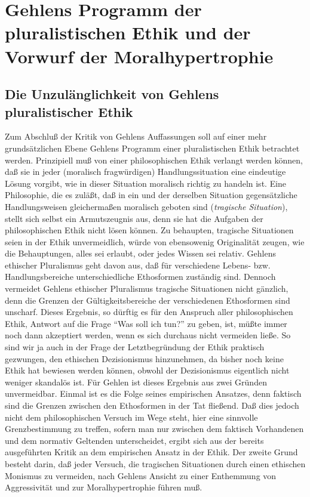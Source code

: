\documentclass[12pt,a4paper]{article}
\begin{document}
\section{Gehlens Programm der pluralistischen Ethik und der Vorwurf der Moralhypertrophie}

\subsection{Die Unzulänglichkeit von Gehlens pluralistischer Ethik}

Zum Abschluß der Kritik von Gehlens Auffassungen soll auf einer mehr
grundsätzlichen Ebene Gehlens Programm einer pluralistischen Ethik
betrachtet werden. Prinzipiell muß von einer philosophischen Ethik verlangt
werden können, daß sie in jeder (moralisch fragwürdigen)
Handlungssituation eine eindeutige Lösung vorgibt, wie in dieser Situation
moralisch richtig zu handeln ist. Eine Philosophie, die es zuläßt, daß in
ein und der derselben Situation gegensätzliche Handlungsweisen
gleichermaßen moralisch geboten sind ({\em tragische Situation}), stellt
sich selbst ein Armutszeugnis aus, denn sie hat die Aufgaben der
philosophischen Ethik nicht lösen können. Zu behaupten, tragische
Situationen seien in der Ethik unvermeidlich, würde von ebensowenig
Originalität zeugen, wie die Behauptungen, alles sei erlaubt, oder jedes
Wissen sei relativ. Gehlens ethischer Pluralismus geht davon aus, daß für
verschiedene Lebens- bzw. Handlungsbereiche unterschiedliche Ethosformen
zuständig sind. Dennoch vermeidet Gehlens ethischer Pluralismus tragische
Situationen nicht gänzlich, denn die Grenzen der Gültigkeitsbereiche der
verschiedenen Ethosformen sind unscharf. Dieses Ergebnis, so dürftig es für
den Anspruch aller philosophischen Ethik, Antwort auf die Frage "`Was soll
ich tun?"' zu geben, ist, müßte immer noch dann akzeptiert werden, wenn es
sich durchaus nicht vermeiden ließe. So sind wir ja auch in der Frage der
Letztbegründung der Ethik praktisch gezwungen, den ethischen Dezisionismus
hinzunehmen, da bisher noch keine Ethik hat bewiesen werden können, obwohl
der Dezisionismus eigentlich nicht weniger skandalös ist. Für Gehlen ist
dieses Ergebnis aus zwei Gründen unvermeidbar. Einmal ist es die
Folge seines empirischen Ansatzes, denn faktisch sind die Grenzen zwischen
den Ethosformen in der Tat fließend. Daß dies jedoch nicht dem
philosophischen Versuch im Wege steht, hier eine sinnvolle Grenzbestimmung zu
treffen, sofern man nur zwischen dem faktisch Vorhandenen und dem normativ
Geltenden unterscheidet, ergibt sich aus der bereits ausgeführten Kritik an
dem empirischen Ansatz in der Ethik. Der zweite Grund besteht darin, daß
jeder Versuch, die tragischen Situationen durch einen ethischen Monismus zu
vermeiden, nach Gehlens Ansicht zu einer Enthemmung von Aggressivität und zur
Moralhypertrophie führen muß.
\end{document}
